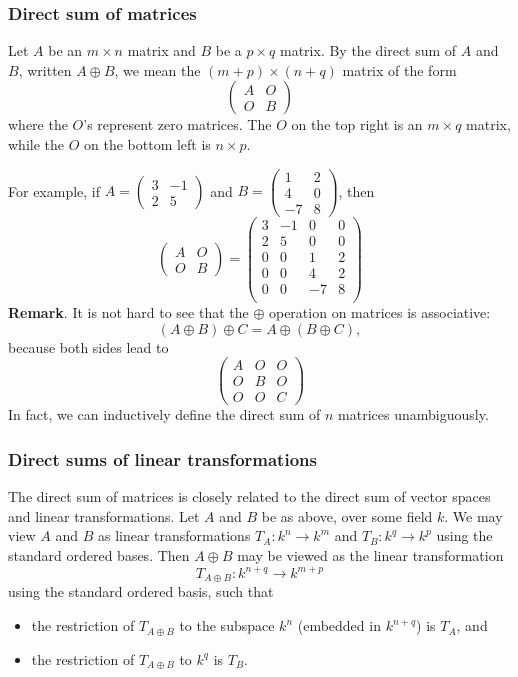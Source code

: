 \documentclass[12pt]{article}
\begin{document}
\subsubsection*{Direct sum of matrices}

Let $A$ be an $m\times n$ matrix and $B$ be a $p\times q$ matrix.  By the direct sum of $A$ and $B$, written $A\oplus B$, we mean the $(m+p)\times (n+q)$ matrix of the form 
$$
\begin{pmatrix}
A & O \\
O & B 
\end{pmatrix}
$$
where the $O$'s represent zero matrices.  The $O$ on the top right is an $m\times q$ matrix, while the $O$ on the bottom left is $n\times p$.

For example, if $A=\begin{pmatrix} 3 &-1\\ 2&5\end{pmatrix}$ and $B=\begin{pmatrix} 1&2\\ 4&0\\ -7&8 \end{pmatrix}$, then 
$$
\begin{pmatrix}
A & O \\
O & B 
\end{pmatrix}=
\begin{pmatrix}
3&-1 & 0&0 \\
2&5 & 0&0 \\
0&0 & 1&2 \\
0&0 & 4&2 \\
0&0 & -7&8 \\
\end{pmatrix}
$$
\textbf{Remark}.  
It is not hard to see that the $\oplus$ operation on matrices is associative: $$(A\oplus B)\oplus C = A \oplus (B\oplus C),$$ because both sides lead to  
$$
\begin{pmatrix}
A & O & O \\
O & B & O \\
O & O & C 
\end{pmatrix}
$$
In fact, we can inductively define the direct sum of $n$ matrices unambiguously.

\subsubsection*{Direct sums of linear transformations}
The direct sum of matrices is closely related to the direct sum of vector spaces and linear transformations.  Let $A$ and $B$ be as above, over some field $k$.  We may view $A$ and $B$ as linear transformations $T_A:k^n\to k^m$ and $T_B: k^q\to k^p$ using the standard ordered bases.  Then $A\oplus B$ may be viewed as the linear transformation $$T_{A\oplus B}: k^{n+q}\to k^{m+p}$$ using the standard ordered basis, such that 
\begin{itemize}
\item the restriction of $T_{A\oplus B}$ to the subspace $k^n$ (embedded in $k^{n+q}$) is $T_A$, and 
\item the restriction of $T_{A\oplus B}$ to $k^q$ is $T_B$.
\end{itemize}
\end{document}
